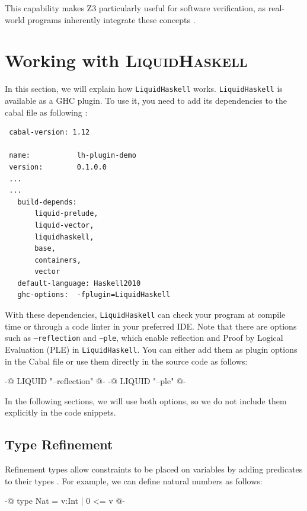 \documentclass[]{rptuseminar}
\begin{document}
This capability makes Z3 particularly useful for software verification, as real-world programs inherently integrate these concepts \cite{nikolaj_bjorner_programming_nodate}.
\section{Working with \textsc{LiquidHaskell}}
\label{sec:lh}
In this section, we will explain how \texttt{LiquidHaskell} works.
\texttt{LiquidHaskell} is available as a GHC plugin. To use it, you need to add its dependencies to the cabal file as following \cite{noauthor_ucsd-progsyslh-plugin-demo_2024}:

\vspace{1em}
\begin{lstlisting}
 cabal-version: 1.12

 name:           lh-plugin-demo
 version:        0.1.0.0
 ...
 ...
   build-depends:
       liquid-prelude,
       liquid-vector,
       liquidhaskell,
       base,
       containers,
       vector
   default-language: Haskell2010
   ghc-options:  -fplugin=LiquidHaskell
\end{lstlisting}
\vspace{1em}

With these dependencies, \texttt{LiquidHaskell} can check your program at compile time or through a code linter in your preferred IDE.  
Note that there are options such as \texttt{---reflection} and \texttt{---ple}, which enable reflection and Proof by Logical Evaluation (PLE) in \texttt{LiquidHaskell}.  
You can either add them as plugin options in the Cabal file or use them directly in the source code as follows:  

\begin{haskell}  
{-@ LIQUID "--reflection" @-}  
{-@ LIQUID "--ple" @-}  
\end{haskell}  

In the following sections, we will use both options, so we do not include them explicitly in the code snippets. 

\subsection{Type Refinement}
Refinement types allow constraints to be placed on variables by adding predicates to their types
\cite{jhala_programming_2020}. For example, we can define natural numbers as follows:

\begin{haskell}
 {-@ type Nat = {v:Int | 0 <= v} @-}
\end{haskell}
\end{document}
